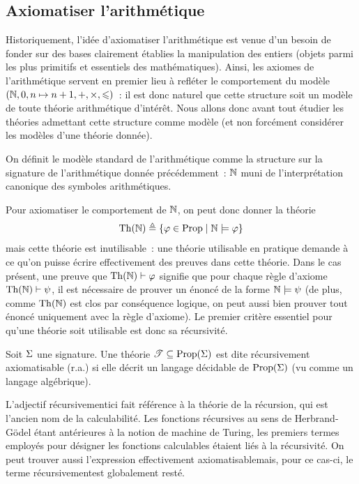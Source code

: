 \subsection{Axiomatiser l'arithmétique}

Historiquement, l'idée d'axiomatiser l'arithmétique est venue d'un besoin de
fonder sur des bases clairement établies la manipulation des entiers (objets
parmi les plus primitifs et essentiels des mathématiques). Ainsi, les axiomes
de l'arithmétique servent en premier lieu à refléter le comportement du modèle
$(\mathbb N,0,n\mapsto n+1, +, \times, \leqslant)$~: il est donc naturel que cette
structure soit un modèle de toute théorie arithmétique d'intérêt. Nous allons
donc avant tout étudier les théories admettant cette structure comme modèle
(et non forcément considérer les modèles d'une théorie donnée).

\begin{definition}
  On définit le modèle standard de l'arithmétique comme la structure sur la
  signature de l'arithmétique donnée précédemment~: $\mathbb N$ muni de
  l'interprétation canonique des symboles arithmétiques.
\end{definition}

Pour axiomatiser le comportement de $\mathbb N$, on peut donc donner la théorie
\[\operatorname{Th}(\mathbb N)\triangleq \left\{ \varphi \in \operatorname{Prop} \;\middle\vert\; \mathbb N \models \varphi \right\}\]
mais cette théorie est inutilisable~: une théorie utilisable en pratique demande
à ce qu'on puisse écrire effectivement des preuves dans cette théorie. Dans le
cas présent, une preuve que $\operatorname{Th}(\mathbb N)\vdash \varphi$ signifie que pour chaque
règle d'axiome $\operatorname{Th}(\mathbb N) \vdash \psi$, il est nécessaire de prouver un énoncé
de la forme $\mathbb N \models \psi$ (de plus, comme $\operatorname{Th}(\mathbb N)$ est clos par
conséquence logique, on peut aussi bien prouver tout énoncé uniquement avec la
règle d'axiome). Le premier critère essentiel pour qu'une théorie soit
utilisable est donc sa récursivité.

\begin{definition}
  Soit $\Sigma$ une signature. Une théorie $\mathscr T \subseteq \operatorname{Prop}(\Sigma)$
  est dite récursivement axiomatisable (r.a.) si elle décrit un langage
  décidable de $\operatorname{Prop}(\Sigma)$ (vu comme un langage algébrique).
\end{definition}

\begin{remark}
  L'adjectif \og récursivement\fg ici fait référence à la théorie de la
  récursion, qui est l'ancien nom de la calculabilité. Les fonctions récursives
  au sens de Herbrand-Gödel étant antérieures à la notion de machine de Turing,
  les premiers termes employés pour désigner les fonctions calculables étaient
  liés à la récursivité. On peut trouver aussi l'expression \og effectivement
  axiomatisable\fg mais, pour ce cas-ci, le terme \og récursivement\fg est
  globalement resté.
\end{remark}

